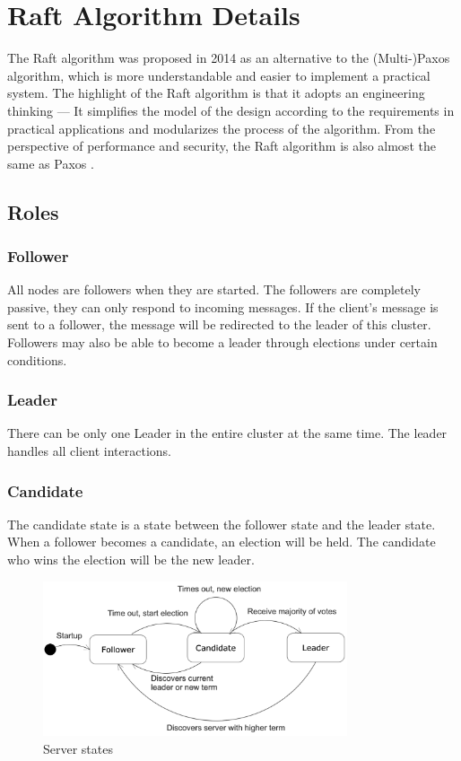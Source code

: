 \documentclass[12pt, a4paper]{article}
\begin{document}
\section{Raft Algorithm Details} \label{sec:raft}

The Raft algorithm was proposed in 2014\cite{conf/usenix/OngaroO14} as an alternative to the (Multi-)Paxos algorithm, which is more
understandable and easier to implement a practical system. The highlight of the Raft algorithm is that it adopts an
engineering thinking --- It simplifies the model of the design according to the requirements in practical applications and
modularizes the process of the algorithm. From the perspective of performance and security, the Raft algorithm is also almost
the same as Paxos \cite{conf/usenix/OngaroO14}.

\subsection{Roles}

  \subsubsection{Follower}
  All nodes are followers when they are started. The followers are completely passive, they can only respond to incoming
  messages. If the client's message is sent to a follower, the message will be redirected to the leader of this cluster. Followers may
  also be able to become a leader through elections under certain conditions.

  \subsubsection{Leader}
  There can be only one Leader in the entire cluster at the same time. The leader handles all client interactions.

  \subsubsection{Candidate}
  The candidate state is a state between the follower state and the leader state. When a follower becomes a candidate, an election
  will be held. The candidate who wins the election will be the new leader.
  \begin{figure}[htp]
      \centering
      \includegraphics[width=0.8\textwidth]{img/raft-state-diagram.png}
      \caption{Server states}
      \label{fig:raft-states}
  \end{figure}
\end{document}
